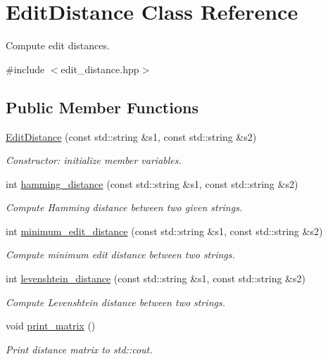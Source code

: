 \hypertarget{class_edit_distance}{\section{Edit\+Distance Class Reference}
\label{class_edit_distance}
}


Compute edit distances.  




{\ttfamily \#include $<$edit\+\_\+distance.\+hpp$>$}

\subsection*{Public Member Functions}
\begin{DoxyCompactItemize}
\item 
\hyperlink{class_edit_distance_a28aea371a78e519dd05b00de2cf8b5b1}{Edit\+Distance} (const std\+::string \&s1, const std\+::string \&s2)
\begin{DoxyCompactList}\small\item\em Constructor\+: initialize member variables. \end{DoxyCompactList}\item 
int \hyperlink{class_edit_distance_a8ea0357bb6c97f575cc415cac08be837}{hamming\+\_\+distance} (const std\+::string \&s1, const std\+::string \&s2)
\begin{DoxyCompactList}\small\item\em Compute Hamming distance between two given strings. \end{DoxyCompactList}\item 
int \hyperlink{class_edit_distance_a1018bf9b68bf553682dbd9a03a68d4e3}{minimum\+\_\+edit\+\_\+distance} (const std\+::string \&s1, const std\+::string \&s2)
\begin{DoxyCompactList}\small\item\em Compute minimum edit distance between two strings. \end{DoxyCompactList}\item 
int \hyperlink{class_edit_distance_ae86ce77eb227f1aaf22cc465b69bf3bf}{levenshtein\+\_\+distance} (const std\+::string \&s1, const std\+::string \&s2)
\begin{DoxyCompactList}\small\item\em Compute Levenshtein distance between two strings. \end{DoxyCompactList}\item 
void \hyperlink{class_edit_distance_aa39cc1e96f89ff762a15bafb4133558a}{print\+\_\+matrix} ()
\begin{DoxyCompactList}\small\item\em Print distance matrix to std\+::cout. \end{DoxyCompactList}\end{DoxyCompactItemize}
